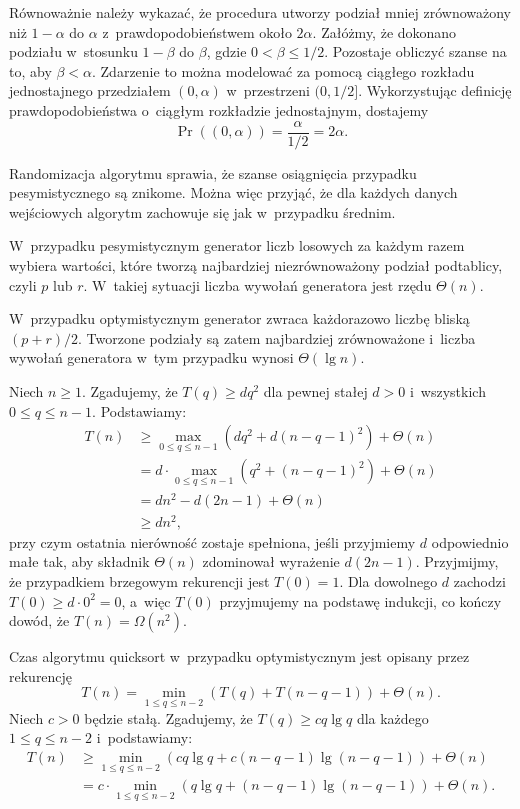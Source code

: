 \exercise %
Równoważnie należy wykazać, że procedura  utworzy podział mniej zrównoważony niż $1-\alpha$ do $\alpha$ z~prawdopodobieństwem około $2\alpha$. Załóżmy, że dokonano podziału w~stosunku $1-\beta$ do $\beta$, gdzie $0<\beta\le1/2$. Pozostaje obliczyć szanse na to, aby $\beta<\alpha$. Zdarzenie to można modelować za pomocą ciągłego rozkładu jednostajnego przedziałem $(0,\alpha)$ w~przestrzeni $(0,1/2]$. Wykorzystując definicję prawdopodobieństwa o~ciągłym rozkładzie jednostajnym, dostajemy
\[
	\Pr((0,\alpha)) = \frac{\alpha}{1/2} = 2\alpha.
\]


\exercise %
Randomizacja algorytmu sprawia, że szanse osiągnięcia przypadku pesymistycznego są znikome. Można więc przyjąć, że dla każdych danych wejściowych algorytm zachowuje się jak w~przypadku średnim.

\exercise %
W~przypadku pesymistycznym generator liczb losowych za każdym razem wybiera wartości, które tworzą najbardziej niezrównoważony podział podtablicy, czyli $p$ lub $r$. W~takiej sytuacji liczba wywołań generatora jest rzędu $\Theta(n)$.

W~przypadku optymistycznym generator zwraca każdorazowo liczbę bliską $(p+r)/2$. Tworzone podziały są zatem najbardziej zrównoważone i~liczba wywołań generatora w~tym przypadku wynosi $\Theta(\lg n)$.


\exercise %
Niech $n\ge1$. Zgadujemy, że $T(q)\ge dq^2$ dla pewnej stałej $d>0$ i~wszystkich $0\le q\le n-1$. Podstawiamy:
\begin{align*}
	T(n) &\ge \max_{0\le q\le n-1}(dq^2+d(n-q-1)^2)+\Theta(n) \\
	&= d\cdot\!\!\!\max_{0\le q\le n-1}(q^2+(n-q-1)^2)+\Theta(n) \\
	&= dn^2-d(2n-1)+\Theta(n) \\
	&\ge dn^2,
\end{align*}
przy czym ostatnia nierówność zostaje spełniona, jeśli przyjmiemy $d$ odpowiednio małe tak, aby składnik $\Theta(n)$ zdominował wyrażenie $d(2n-1)$. Przyjmijmy, że przypadkiem brzegowym rekurencji jest $T(0)=1$. Dla dowolnego $d$ zachodzi $T(0)\ge d\cdot0^2=0$, a~więc $T(0)$ przyjmujemy na podstawę indukcji, co kończy dowód, że $T(n)=\Omega(n^2)$.

\exercise %
Czas algorytmu quicksort w~przypadku optymistycznym jest opisany przez rekurencję
\[
    T(n) = \min_{1\le q\le n-2}(T(q)+T(n-q-1))+\Theta(n).
\]
Niech $c>0$ będzie stałą. Zgadujemy, że $T(q)\ge cq\lg q$ dla każdego $1\le q\le n-2$ i~podstawiamy:
\begin{align*}
    T(n) &\ge \min_{1\le q\le n-2}(cq\lg q+c(n-q-1)\lg(n-q-1))+\Theta(n) \\
	&= c\cdot\!\!\!\min_{1\le q\le n-2}(q\lg q+(n-q-1)\lg(n-q-1))+\Theta(n).
\end{align*}

